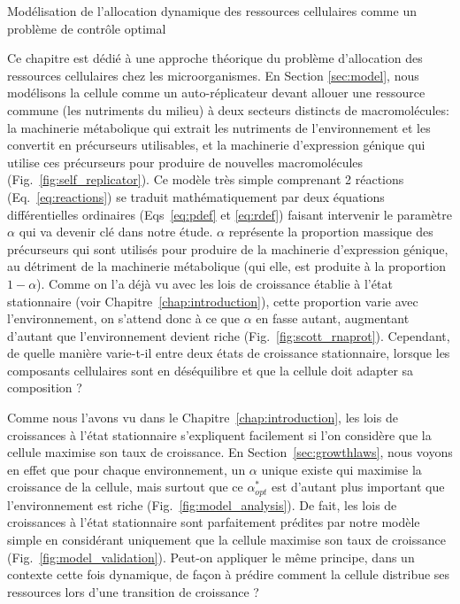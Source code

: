 \begin{chapter_summary}{Modélisation de l'allocation dynamique des ressources cellulaires comme un problème de contrôle optimal}

Ce chapitre est dédié à une approche théorique du problème d'allocation des ressources cellulaires chez les microorganismes.
En Section \ref{sec:model}, nous modélisons la cellule comme un auto-réplicateur devant allouer une ressource commune (les nutriments du milieu) à deux secteurs distincts de macromolécules: la machinerie métabolique qui extrait les nutriments de l'environnement et les convertit en précurseurs utilisables, et la machinerie d'expression génique qui utilise ces précurseurs pour produire de nouvelles macromolécules (Fig.~\ref{fig:self_replicator}).
Ce modèle très simple comprenant 2 réactions (Eq.~\ref{eq:reactions}) se traduit mathématiquement par deux équations différentielles ordinaires (Eqs~\ref{eq:pdef} et \ref{eq:rdef}) faisant intervenir le paramètre $\alpha$ qui va devenir clé dans notre étude.
$\alpha$ représente la proportion massique des précurseurs qui sont utilisés pour produire de la machinerie d'expression génique, au détriment de la machinerie métabolique (qui elle, est produite à la proportion $1-\alpha$).
Comme on l'a déjà vu avec les lois de croissance établie à l'état stationnaire (voir Chapitre~\ref{chap:introduction}), cette proportion varie avec l'environnement, on s'attend donc à ce que $\alpha$ en fasse autant, augmentant d'autant que l'environnement devient riche (Fig.~\ref{fig:scott_rnaprot}).
Cependant, de quelle manière varie-t-il entre deux états de croissance stationnaire, lorsque les composants cellulaires sont en déséquilibre et que la cellule doit adapter sa composition ?

Comme nous l'avons vu dans le Chapitre~\ref{chap:introduction}, les lois de croissances à l'état stationnaire s'expliquent facilement si l'on considère que la cellule maximise son taux de croissance.
En Section~\ref{sec:growthlaws}, nous voyons en effet que pour chaque environnement, un $\alpha$ unique existe qui maximise la croissance de la cellule, mais surtout que ce $\alpha^*_{opt}$ est d'autant plus important que l'environnement est riche (Fig.~\ref{fig:model_analysis}).
De fait, les lois de croissances à l'état stationnaire sont parfaitement prédites par notre modèle simple en considérant uniquement que la cellule maximise son taux de croissance (Fig.~\ref{fig:model_validation}).
Peut-on appliquer le même principe, dans un contexte cette fois dynamique, de façon à prédire comment la cellule distribue ses ressources lors d'une transition de croissance ?


\end{chapter_summary}
